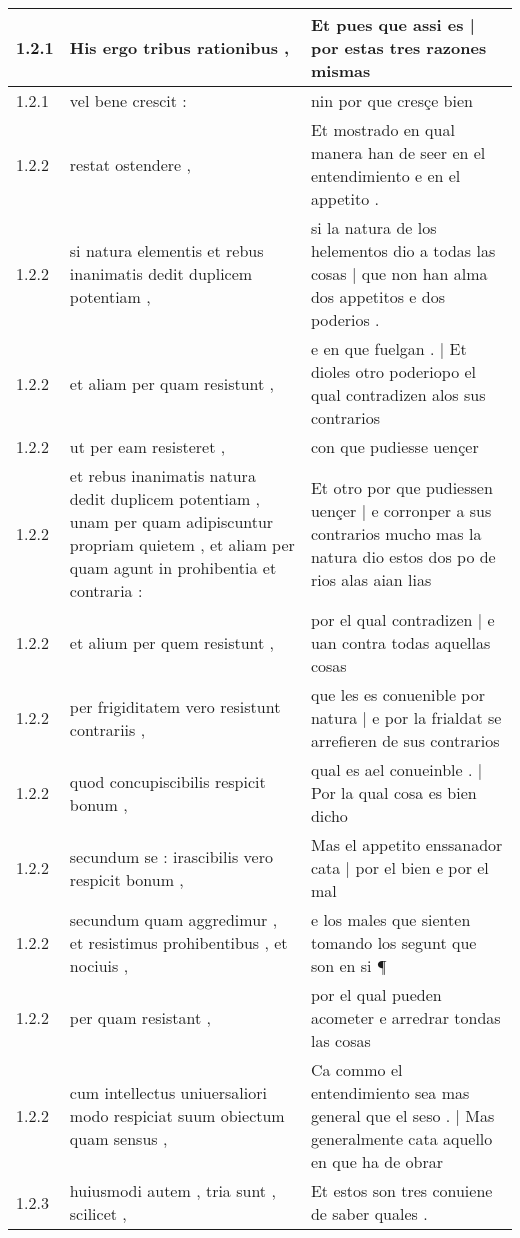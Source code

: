 \begin{tabular}{|p{1cm}|p{6.5cm}|p{6.5cm}|}
1.2.1 & His ergo tribus rationibus , & Et pues que assi es | por estas tres razones mismas \\\hline
1.2.1 & vel bene crescit : & nin por que cresçe bien \\\hline
1.2.2 & restat ostendere , & Et mostrado en qual manera han de seer en el entendimiento e en el appetito . \\\hline
1.2.2 & si natura elementis et rebus inanimatis dedit duplicem potentiam , & si la natura de los helementos dio a todas las cosas | que non han alma dos appetitos e dos poderios . \\\hline
1.2.2 & et aliam per quam resistunt , & e en que fuelgan . | Et dioles otro poderiopo el qual contradizen alos sus contrarios \\\hline
1.2.2 & ut per eam resisteret , & con que pudiesse uençer \\\hline
1.2.2 & et rebus inanimatis natura dedit duplicem potentiam , unam per quam adipiscuntur propriam quietem , et aliam per quam agunt in prohibentia et contraria : & Et otro por que pudiessen uençer | e corronper a sus contrarios mucho mas la natura dio estos dos po de rios alas aian lias \\\hline
1.2.2 & et alium per quem resistunt , & por el qual contradizen | e uan contra todas aquellas cosas \\\hline
1.2.2 & per frigiditatem vero resistunt contrariis , & que les es conuenible por natura | e por la frialdat se arrefieren de sus contrarios \\\hline
1.2.2 & quod concupiscibilis respicit bonum , & qual es ael conueinble . | Por la qual cosa es bien dicho \\\hline
1.2.2 & secundum se : irascibilis vero respicit bonum , & Mas el appetito enssanador cata | por el bien e por el mal \\\hline
1.2.2 & secundum quam aggredimur , et resistimus prohibentibus , et nociuis , & e los males que sienten tomando los segunt que son en si ¶ \\\hline
1.2.2 & per quam resistant , & por el qual pueden acometer e arredrar tondas las cosas \\\hline
1.2.2 & cum intellectus uniuersaliori modo respiciat suum obiectum quam sensus , & Ca commo el entendimiento sea mas general que el seso . | Mas generalmente cata aquello en que ha de obrar \\\hline
1.2.3 & huiusmodi autem , tria sunt , scilicet , & Et estos son tres conuiene de saber quales . \\\hline

\end{tabular}
